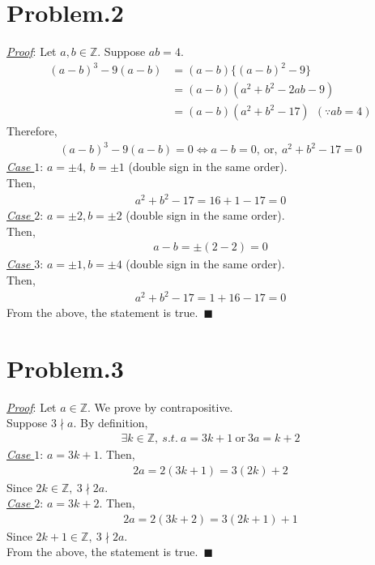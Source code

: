 \documentclass[12pt]{article}
\begin{document}
\section*{Problem.2}
\underline{\textit{Proof}}: Let $a, b \in \mathbb{Z}$. Suppose $ab = 4$.\\
\begin{align*}
(a-b)^3 - 9(a-b) &= (a-b)\{(a-b)^2-9\}\\[1em]
&= (a-b)(a^2 + b^2 -2ab -9)\\[1em]
&= (a-b)(a^2 + b^2 -17) ~~(\because ab = 4)
\end{align*}
Therefore,
\begin{align*}
(a-b)^3 - 9(a-b) = 0 \Leftrightarrow a-b = 0,~\mathrm{or},~ a^2 + b^2 -17 = 0
\end{align*}
\underline{\textit{Case $1$}}: $a = \pm 4,~b = \pm 1$ (double sign in the same order).\\
Then,
\begin{gather*}
a^2 + b^2 -17 = 16 + 1 - 17 = 0
\end{gather*}
\underline{\textit{Case $2$}}: $a = \pm 2, b = \pm 2$ (double sign in the same order).\\
Then,
\begin{gather*}
a - b = \pm (2 - 2) = 0
\end{gather*}
\underline{\textit{Case $3$}}: $a = \pm 1, b = \pm 4$ (double sign in the same order).\\
Then,
\begin{gather*}
a^2 + b^2 -17 = 1 + 16 - 17 = 0
\end{gather*}
From the above, the statement is true.~$\blacksquare$

\section*{Problem.3}
\underline{\textit{Proof}}: Let $a \in \mathbb{Z}$. 
We prove by contrapositive.\\
Suppose $3 \nmid a$. By definition,
\begin{gather*}
\exists k \in \mathbb{Z},~s.t.~ a = 3k + 1 ~\mathrm{or}~ 3a = k + 2
\end{gather*}
\underline{\textit{Case $1$}}: $a = 3k + 1$.
Then,
\begin{gather*}
2a = 2(3k + 1) = 3(2k) + 2
\end{gather*}
Since $2k \in \mathbb{Z}, ~3 \nmid 2a$.\\[1em]
\underline{\textit{Case $2$}}: $a = 3k + 2$.
Then,
\begin{gather*}
2a = 2(3k + 2) = 3(2k+1) + 1
\end{gather*}
Since $ 2k+1 \in \mathbb{Z}, ~3 \nmid 2a$.\\[1em]
From the above, the statement is true.~$\blacksquare$
\end{document}
